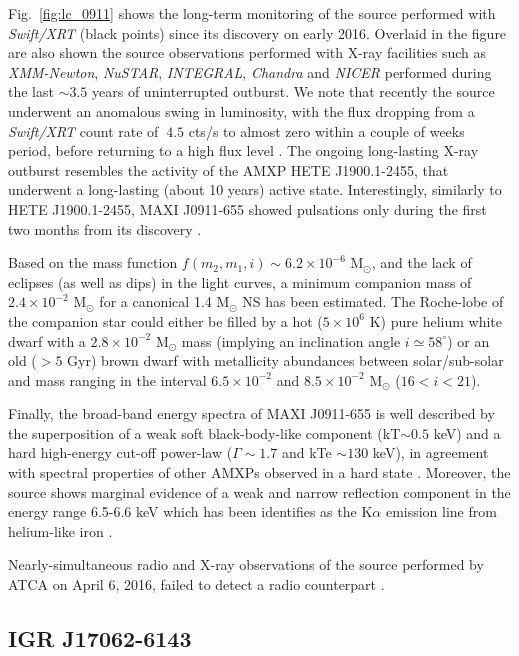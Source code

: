 \documentclass[graybox]{svmult}
\def \inte {{\em INTEGRAL\xspace}}
\def \chandra {{\em Chandra\xspace}}
\def \xmm {{\em XMM-Newton\xspace}}
\def \swiftxrt{{\em Swift/XRT\xspace}}
\def \nustar{{\em NuSTAR\xspace}}
\def \nicer{{\em NICER\xspace}}
\begin{document}
Fig.~\ref{fig:lc_0911} shows the long-term monitoring of the source performed with \swiftxrt{} (black points) since its discovery on early 2016. Overlaid in the figure are also shown the source observations performed with X-ray facilities such as \xmm{}, \nustar{}, \inte{}, \chandra{} and \nicer{} performed during the last $\sim3.5$ years of uninterrupted outburst. We note that recently the source underwent an anomalous swing in luminosity, with the flux dropping from a \swiftxrt{} count rate of $~4.5$ cts/s to almost zero within a couple of weeks period, before returning to a high flux level \cite{Bult2019b}. The ongoing long-lasting X-ray outburst resembles the activity of the AMXP HETE J1900.1-2455, that underwent a long-lasting (about 10 years) active state. 
Interestingly, similarly to HETE J1900.1-2455, MAXI J0911-655 showed pulsations only during the first two months from its discovery \cite{Sanna2017a}.

Based on the mass function $f(m_2, m_1, i) \sim 6.2\times10^{-6}$ M$_\odot$, and the lack of eclipses (as well as dips) in the light curves, a minimum companion mass of $2.4\times 10^{-2}$ M$_\odot$ for a canonical 1.4 M$_\odot$ NS has been estimated. The Roche-lobe of the companion star could either be filled by a hot ($5\times10^{6}$ K) pure helium white dwarf with a $2.8\times 10^{-2}$ M$_\odot$ mass (implying an inclination angle $i\simeq 58^\circ$) or an old ($>5$ Gyr) brown dwarf with metallicity abundances between solar/sub-solar and mass ranging in the interval $6.5\times 10^{-2}$ and $8.5\times 10^{-2}$ M$_\odot$ ($16 < i < 21$). 

Finally, the broad-band energy spectra of MAXI J0911-655 is well described by the superposition of a weak soft black-body-like component (kT$\sim0.5$ keV) and a hard high-energy cut-off power-law ($\Gamma \sim 1.7$ and kTe $\sim130$ keV), in agreement with spectral properties of other AMXPs observed in a hard state \cite{Falanga2005a,Falanga2005b,Gierlinski2005,Patruno2009, Papitto2009,Papitto2009,Papitto2013a}. Moreover, the source shows marginal evidence of a weak and narrow reflection component in the energy range 6.5-6.6 keV which has been identifies as the K$\alpha$ emission line from helium-like iron \cite{Sanna2017a}.

Nearly-simultaneous radio and X-ray observations of the source performed by ATCA on April 6, 2016, failed to detect a radio counterpart \cite{Tudor2016}.


\subsection{IGR J17062-6143}
\end{document}

